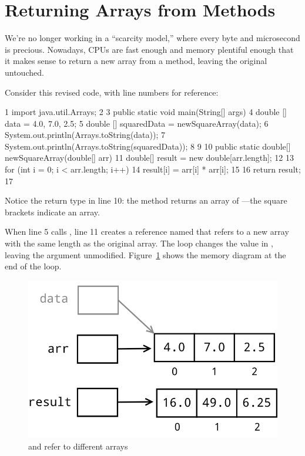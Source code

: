 \section{Returning Arrays from Methods}

We're no longer working in a ``scarcity model,'' where every byte and microsecond is precious. Nowadays, CPUs are fast enough and memory plentiful enough that it makes sense to return a new array from a method, leaving the original untouched.

Consider this revised code, with line numbers for reference:

\begin{code}
 1 import java.util.Arrays;
 2
 3 public static void main(String[] args) {
 4     double [] data = {4.0, 7.0, 2.5};
 5     double [] squaredData = newSquareArray(data);
 6     System.out.println(Arrays.toString(data)); 
 7     System.out.println(Arrays.toString(squaredData));
 8 }
 9
10 public static double[] newSquareArray(double[] arr) {
11     double[] result = new double[arr.length];
12    
13     for (int i = 0; i < arr.length; i++) {
14         result[i] = arr[i] * arr[i];
15     }
16     return result;
17 }
\end{code}

Notice the return type in line 10: the method returns an array of ---the square brackets indicate an array.

When line 5 calls , line 11 creates a reference named  that refers to a new array with the same length as the original array. The loop changes the value in , leaving the argument  unmodified. Figure~\ref{fig.returnArray1} shows the memory diagram at the end of the loop.

\begin{figure}[!h]
\begin{center}
\includegraphics[scale=0.5]{figs/ch07/return_array1.png}
\caption{ and  refer to different arrays}
\label{fig.returnArray1}
\end{center}
\end{figure}


